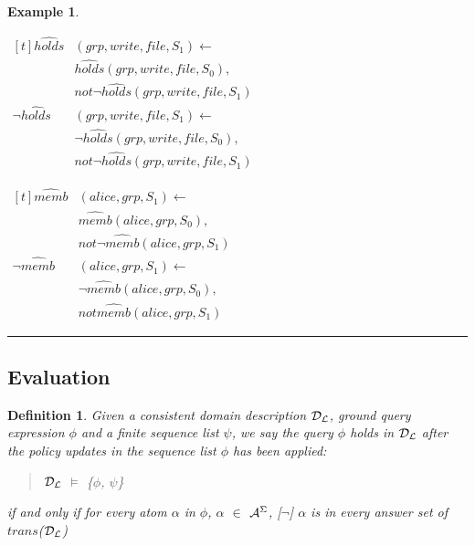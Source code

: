 \documentclass[10pt, twocolumn]{article}
\newtheorem{definition}{Definition}
\newtheorem{examp}{Example}
\newenvironment{example}{\begin{examp}\rm}{\rule{2mm}{2mm}\end{examp}}
\begin{document}
\begin{example}
\begin{enumerate}
              \begin{math}
                \begin{aligned}[t]
                  \hat{holds}&(grp, write, file, S_{1}) \leftarrow \\
                  & \hat{holds}(grp, write, file, S_{0}), \\
                  & not \lnot \hat{holds}(grp, write, file, S_{1}) \\
                  \lnot \hat{holds}&(grp, write, file, S_{1}) \leftarrow \\
                  & \lnot \hat{holds}(grp, write, file, S_{0}), \\
                  & not \lnot \hat{holds}(grp, write, file, S_{1})
                \end{aligned}
              \end{math}

              \begin{math}
                \begin{aligned}[t]
                  \hat{memb}&(alice, grp, S_{1}) \leftarrow \\
                  & \hat{memb}(alice, grp, S_{0}), \\
                  & not \lnot \hat{memb}(alice, grp, S_{1}) \\
                  \lnot \hat{memb}&(alice, grp, S_{1}) \leftarrow \\
                  & \lnot \hat{memb}(alice, grp, S_{0}), \\
                  & not \hat{memb}(alice, grp, S_{1})
                \end{aligned}
              \end{math}
          \end{enumerate}
        \end{example}
      \subsection{Evaluation}

        \begin{definition}
          Given a consistent domain description ${\cal D}_{\cal L}$, ground
          query expression $\phi$ and a finite sequence list $\psi$, we say the
          query $\phi$ holds in ${\cal D}_{\cal L}$ after the policy updates
          in the sequence list $\phi$ has been applied:

          \begin{quote}
            ${\cal D}_{\cal L}$ $\models$ \{$\phi$, $\psi$\}
          \end{quote}

          \noindent if and only if for every atom $\alpha$ in $\phi$, $\alpha$
          $\in$ ${\cal A}^{\Sigma}$, [$\lnot$] $\alpha$ is in every answer
          set of $trans$(${\cal D}_{\cal L}$)
        \end{definition}
\end{document}
